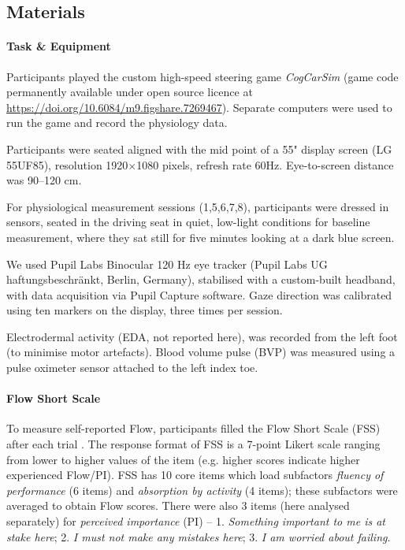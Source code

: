 \documentclass[10pt,letterpaper,floatsintext]{article}
\begin{document}
\subsection*{Materials}
\paragraph{Task \& Equipment} Participants played the custom high-speed steering game {\it CogCarSim} (game code permanently available under open source licence at \url{https://doi.org/10.6084/m9.figshare.7269467}). Separate computers were used to run the game and record the physiology data.

Participants were seated aligned with the mid point of a 55" display screen (LG 55UF85), resolution 1920$\times$1080 pixels, refresh rate 60Hz. Eye-to-screen distance was 90--120 cm.

For physiological measurement sessions (1,5,6,7,8), participants were dressed in sensors, seated in the driving seat in quiet, low-light conditions for baseline measurement, where they sat still for five minutes looking at a dark blue screen.

We used Pupil Labs Binocular 120 Hz eye tracker (Pupil Labs UG haftungsbeschr\"{a}nkt, Berlin, Germany), stabilised with a custom-built headband, with data acquisition via Pupil Capture software. Gaze direction was calibrated using ten markers on the display, three times per session.

Electrodermal activity (EDA, not reported here),  was recorded from the left foot (to minimise motor artefacts). Blood volume pulse (BVP) was measured using a pulse oximeter sensor attached to the left index toe.

\paragraph{Flow Short Scale} To measure self-reported Flow, participants filled the Flow Short Scale (FSS) after each trial \cite{Cowley2019flow}. The response format of FSS is a 7-point Likert scale ranging from lower to higher values of the item (e.g. higher scores indicate higher experienced Flow/PI). FSS has 10 core items which load subfactors {\it fluency of performance} (6 items) and {\it absorption by activity} (4 items); these subfactors were averaged to obtain Flow scores. There were also 3 items (here analysed separately) for {\it perceived importance} (PI) -- 1. \textit{Something important to me is at stake here}; 2. \textit{I must not make any mistakes here}; 3. \textit{I am worried about failing}.
\end{document}
